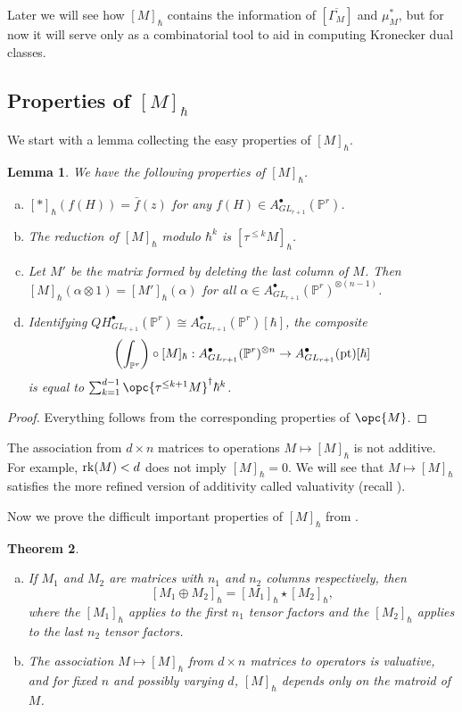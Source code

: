\documentclass[12pt]{amsart}
\newcommand{\mb}{\mathbb}
\newcommand{\ol}{\overline}
\newcommand{\pt}{{\rm pt}}
\newcommand{\rk}{{\rm rk}}
\theoremstyle{plain}
\newtheorem{Thm}{Theorem}[section]
\newtheorem{Lem}[Thm]{Lemma}
\theoremstyle{definition}
\theoremstyle{remark}
\begin{document}
Later we will see how $[M]_\hbar$ contains the information of $[\ol{\Gamma_M}]$ and $\mu_M^*$, but for now it will serve only as a combinatorial tool to aid in computing Kronecker dual classes.

\subsection{Properties of $[M]_\hbar$}
We start with a lemma collecting the easy properties of $[M]_\hbar$.
\begin{Lem}\label{mhbareasy}
We have the following properties of $[M]_\hbar$.
\begin{enumerate}[(a)]
\item $[\ast]_\hbar(f(H))=\bar{f}(z)$ for any $f(H) \in A^\bullet_{GL_{r+1}}(\mb{P}^r)$.
\item The reduction of $[M]_\hbar$ modulo $\hbar^k$ is $[\tau^{\leq k} M]_\hbar$.
\item Let $M'$ be the matrix formed by deleting the last column of $M$. Then $[M]_\hbar(\alpha \otimes 1)=[M']_{\hbar}(\alpha)$ for all $\alpha \in A^\bullet_{GL_{r+1}}(\mb{P}^r)^{\otimes(n-1)}$.
\item Identifying $QH^\bullet_{GL_{r+1}}(\mb{P}^r) \cong A^\bullet_{GL_{r+1}}(\mb{P}^r)[\hbar]$, the composite \[\left(\int_{\mb{P}^r}\right) \circ [M]_\hbar : A^\bullet_{GL_{r+1}}(\mb{P}^r)^{\otimes n} \to A^\bullet_{GL_{r+1}}(\pt)[\hbar]\] is equal to $\sum_{k=1}^{d-1} \opc{\tau^{\le k+1}M}^\dagger\hbar^k$.
\end{enumerate}
\end{Lem}
\begin{proof}
Everything follows from the corresponding properties of $\opc{M}$.
\end{proof}

The association from $d \times n$ matrices to operations $M \mapsto [M]_\hbar$ is not additive. For example, $\rk(M) < d$ does not imply $[M]_\hbar=0$. We will see that $M \mapsto [M]_\hbar$ satisfies the more refined version of additivity called valuativity (recall ). 

Now we prove the difficult important properties of $[M]_\hbar$ from .
\begin{Thm}\label{starunion}
\begin{enumerate}[(a)]
\item If $M_1$ and $M_2$ are matrices with $n_1$ and $n_2$ columns respectively, then $$[M_1 \oplus M_2]_\hbar = [M_1]_\hbar \star [M_2]_\hbar,$$ where the $[M_1]_\hbar$ applies to the first $n_1$ tensor factors and the $[M_2]_\hbar$ applies to the last $n_2$ tensor factors.
\item The association $M \mapsto [M]_\hbar$ from $d \times n$ matrices to operators is valuative, and for fixed $n$ and possibly varying $d$, $[M]_\hbar$ depends only on the matroid of $M$.
\end{enumerate}
\end{Thm}
\end{document}
